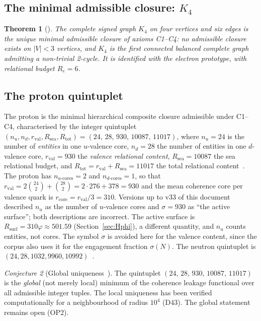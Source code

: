 \documentclass[11pt,a4paper]{article}
\theoremstyle{plain}
\newtheorem{theorem}{Theorem}[section]
\theoremstyle{definition}
\theoremstyle{remark}
\newtheorem{conjecture}[theorem]{Conjecture}
\newcommand{\quintuplet}{(24,\,28,\,930,\,10087,\,11017)}
\newcommand{\rval}{r_{\mathrm{val}}}
\newcommand{\Rsurf}{R_{\mathrm{surf}}}
\newcommand{\sigmaN}{\sigma(N)}
\begin{document}
\subsection{The minimal admissible closure: \texorpdfstring{$K_4$}{K4}}
\label{subsec:K4}
\begin{theorem}[\cite{D16a}]
\label{thm:K4}
The complete signed graph $K_4$ on four vertices and six edges is the unique minimal admissible closure of axioms C1--C4: no admissible closure exists on $|V|<3$ vertices, and $K_4$ is the first connected balanced complete graph admitting a non-trivial 2-cycle. It is identified with the electron prototype, with relational budget $R_e=6$.
\end{theorem}

\subsection{The proton quintuplet}
\label{subsec:quintuplet}
The proton is the minimal hierarchical composite closure admissible under C1--C4, characterised by the integer quintuplet $(n_u, n_d, \rval, R_{\mathrm{sea}}, R_{\mathrm{tot}}) = \quintuplet$, where $n_u=24$ is the number of \emph{entities} in one $u$-valence core, $n_d=28$ the number of entities in one $d$-valence core, $\rval=930$ the \emph{valence relational content}, $R_{\mathrm{sea}}=10087$ the sea relational budget, and $R_{\mathrm{tot}}=\rval+R_{\mathrm{sea}}=11017$ the total relational content~\cite{D01,D16,D16a,D16b}. The proton has $n_{u\text{-cores}}=2$ and $n_{d\text{-cores}}=1$, so that $\rval=2\binom{24}{2}+\binom{28}{2}=2\cdot276+378=930$ and the mean coherence core per valence quark is $r_{\mathrm{core}}=\rval/3=310$. \textcolor{negativered}{Versions up to v33 of this document described $n_u$ as the number of $u$-valence cores and $\sigma=930$ as ``the active surface''; both descriptions are incorrect. The active surface is $\Rsurf=310\varphi\approx501.59$ (Section~\ref{sec:Hphi}), a different quantity, and $n_u$ counts entities, not cores. The symbol $\sigma$ is avoided here for the valence content, since the corpus also uses it for the engagement fraction $\sigmaN$.} The neutron quintuplet is $(24,28,1032,9960,10992)$~\cite{D22}.

\begin{conjecture}[Global uniqueness~\cite{D16,D16b}]
\label{conj:uniqueness}
The quintuplet $\quintuplet$ is the \emph{global} (not merely local) minimum of the coherence leakage functional over all admissible integer tuples. The local uniqueness has been verified computationally for a neighbourhood of radius $10^4$ (D43). The global statement remains open (OP2).
\end{conjecture}
\end{document}
